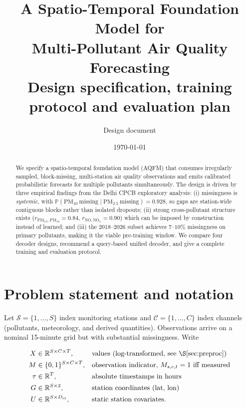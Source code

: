 \documentclass[11pt,a4paper]{article}
\title{\textbf{A Spatio-Temporal Foundation Model for\\ Multi-Pollutant Air Quality Forecasting}\\[0.4em]
\large Design specification, training protocol and evaluation plan}
\author{Design document}
\date{\today}
\newcommand{\R}{\mathbb{R}}
\newcommand{\Prob}{\mathbb{P}}
\newcommand{\Sset}{\mathcal{S}}
\newcommand{\Cset}{\mathcal{C}}
\begin{document}
\maketitle

\begin{abstract}
\noindent
We specify a spatio-temporal foundation model (AQFM) that consumes irregularly
sampled, block-missing, multi-station air quality observations and emits
calibrated probabilistic forecasts for multiple pollutants simultaneously. The
design is driven by three empirical findings from the Delhi CPCB exploratory
analysis: (i) missingness is \emph{systemic}, with
$\Prob(\text{PM}_{10}\ \text{missing}\mid \text{PM}_{2.5}\ \text{missing})=0.928$,
so gaps are station-wide contiguous blocks rather than isolated dropouts;
(ii) strong cross-pollutant structure exists ($r_{\text{PM}_{2.5},\text{PM}_{10}}=0.84$,
$r_{\text{NO},\text{NO}_x}=0.90$) which can be imposed by construction instead of
learned; and (iii) the 2018--2026 subset achieves $7$--$10\%$ missingness on primary
pollutants, making it the viable pre-training window. We compare four decoder
designs, recommend a query-based unified decoder, and give a complete training
and evaluation protocol.
\end{abstract}

\tableofcontents

\section{Problem statement and notation}

Let $\Sset=\{1,\dots,S\}$ index monitoring stations and $\Cset=\{1,\dots,C\}$
index channels (pollutants, meteorology, and derived quantities). Observations
arrive on a nominal 15-minute grid but with substantial missingness. Write

\begin{align}
X &\in \R^{S\times C\times T}, &&\text{values (log-transformed, see \S\ref{sec:preproc})}\\
M &\in \{0,1\}^{S\times C\times T}, &&\text{observation indicator, } M_{s,c,t}=1 \text{ iff measured}\\
\tau &\in \R^{T}, &&\text{absolute timestamps in hours}\\
G &\in \R^{S\times 2}, &&\text{station coordinates (lat, lon)}\\
U &\in \R^{S\times D_{\text{st}}}, &&\text{static station covariates.}
\end{align}
\end{document}
